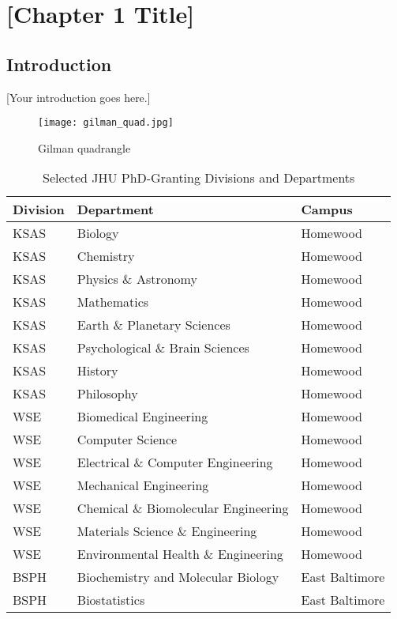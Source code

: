 \chapter{[Chapter 1 Title]}
\label{ch:chapter1}

\section{Introduction}

[Your introduction goes here.]

\begin{figure}[ht]
    \centering
    \texttt{[image: gilman\_quad.jpg]}
    \caption{Gilman quadrangle}
    \label{fig:gilman_quad}
\end{figure}

\begin{table}[ht]
\centering
\caption{Selected JHU PhD-Granting Divisions and Departments}
\label{tab:jhu-divisions-simple}
\begin{tabular}{l|l|l}
\toprule
\textbf{Division} & \textbf{Department} & \textbf{Campus} \\
\midrule
KSAS & Biology & Homewood \\
KSAS & Chemistry & Homewood \\
KSAS & Physics \& Astronomy & Homewood \\
KSAS & Mathematics & Homewood \\
KSAS & Earth \& Planetary Sciences & Homewood \\
KSAS & Psychological \& Brain Sciences & Homewood \\
KSAS & History & Homewood \\
KSAS & Philosophy & Homewood \\
\midrule
WSE & Biomedical Engineering & Homewood \\
WSE & Computer Science & Homewood \\
WSE & Electrical \& Computer Engineering & Homewood \\
WSE & Mechanical Engineering & Homewood \\
WSE & Chemical \& Biomolecular Engineering & Homewood \\
WSE & Materials Science \& Engineering & Homewood \\
WSE & Environmental Health \& Engineering & Homewood \\
\midrule
BSPH & Biochemistry and Molecular Biology & East Baltimore \\
BSPH & Biostatistics & East Baltimore \\

\end{tabular}
\end{table}
